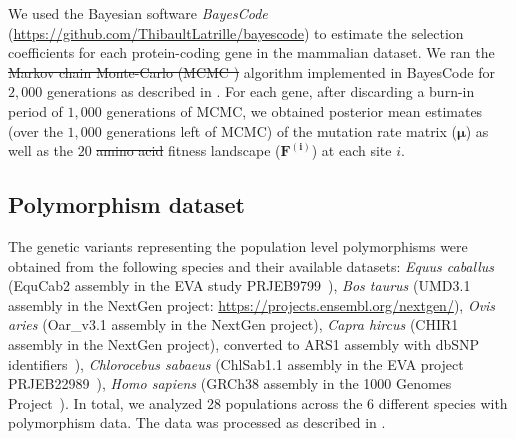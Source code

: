 \documentclass{article}
\newcommand{\UniDimArray}[1]{\bm{#1}}
\providecommand{\DIFaddtex}[1]{{\protect\color{blue}\uwave{#1}}} %
\providecommand{\DIFdeltex}[1]{{\protect\color{red}\sout{#1}}}                      %
\providecommand{\DIFaddbegin}{} %
\providecommand{\DIFaddend}{} %
\providecommand{\DIFdelbegin}{} %
\providecommand{\DIFdelend}{} %
\providecommand{\DIFadd}[1]{\texorpdfstring{\DIFaddtex{#1}}{#1}} %
\providecommand{\DIFdel}[1]{\texorpdfstring{\DIFdeltex{#1}}{}} %
\newcommand{\DIFscaledelfig}{0.5}
\newlength{\DIFdelgraphicswidth} %
\newlength{\DIFdelgraphicsheight} %
\newcommand{\DIFaddincludegraphics}[2][]{{\color{blue}\fbox{\DIFOincludegraphics[#1]{#2}}}} %
\newcommand{\DIFdelincludegraphics}[2][]{%
\sbox{\DIFdelgraphicsbox}{\DIFOincludegraphics[#1]{#2}}%
\settoboxwidth{\DIFdelgraphicswidth}{\DIFdelgraphicsbox} %
\settoboxtotalheight{\DIFdelgraphicsheight}{\DIFdelgraphicsbox} %
\scalebox{\DIFscaledelfig}{%
\parbox[b]{\DIFdelgraphicswidth}{\usebox{\DIFdelgraphicsbox}\\[-\baselineskip] \rule{\DIFdelgraphicswidth}{0em}}\llap{\resizebox{\DIFdelgraphicswidth}{\DIFdelgraphicsheight}{%
\setlength{\unitlength}{\DIFdelgraphicswidth}%
\begin{picture}(1,1)%
\thicklines\linethickness{2pt} %
{\color[rgb]{1,0,0}\put(0,0){\framebox(1,1){}}}%
{\color[rgb]{1,0,0}\put(0,0){\line( 1,1){1}}}%
{\color[rgb]{1,0,0}\put(0,1){\line(1,-1){1}}}%
\end{picture}%
}\hspace*{3pt}}} %
} %
\DeclareRobustCommand{\DIFaddbegin}{\DIFOaddbegin \let\includegraphics\DIFaddincludegraphics} %
\DeclareRobustCommand{\DIFaddend}{\DIFOaddend \let\includegraphics\DIFOincludegraphics} %
\DeclareRobustCommand{\DIFdelbegin}{\DIFOdelbegin \let\includegraphics\DIFdelincludegraphics} %
\DeclareRobustCommand{\DIFdelend}{\DIFOaddend \let\includegraphics\DIFOincludegraphics} %
\begin{document}
    \DIFaddend We used the Bayesian software \textit{BayesCode} (\url{https://github.com/ThibaultLatrille/bayescode}\DIFaddbegin \DIFadd{, v1.3.1}\DIFaddend ) to estimate the selection coefficients for each protein-coding gene in the mammalian dataset.
    We ran the \DIFdelbegin \DIFdel{Markov chain Monte-Carlo (MCMC ) }\DIFdelend \DIFaddbegin \DIFadd{MCMC }\DIFaddend algorithm implemented in BayesCode for $2,000$ generations as described in \textcite{latrille_genes_2023}.
    For each gene, after discarding a burn-in period of $1,000$ generations of MCMC, we obtained posterior mean estimates (over the $1,000$ generations left of MCMC) of the mutation rate matrix ($\UniDimArray{\mu}$) as well as the $20$ \DIFdelbegin \DIFdel{amino acid }\DIFdelend \DIFaddbegin \DIFadd{amino-acid }\DIFaddend fitness landscape ($\UniDimArray{F^{(i)}}$) at each site $i$.

    \subsection{Polymorphism dataset}
    \label{subsec:polymorphism-dataset}

    The genetic variants representing the population level polymorphisms were obtained from the following species and their available datasets: \textit{Equus caballus} (EquCab2 assembly in the EVA study PRJEB9799~\cite{alabri_whole_2020}), \textit{Bos taurus} (UMD3.1 assembly in the NextGen project: \url{https://projects.ensembl.org/nextgen/}), \textit{Ovis aries} (Oar\_v3.1 assembly in the NextGen project), \textit{Capra hircus} (CHIR1 assembly in the NextGen project), converted to ARS1 assembly with dbSNP identifiers~\cite{sherry_dbsnp_2001}), \textit{Chlorocebus sabaeus} (ChlSab1.1 assembly in the EVA project PRJEB22989~\cite{svardal_ancient_2017}), \textit{Homo sapiens} (GRCh38 assembly in the 1000 Genomes Project~\cite{zheng-bradley_alignment_2017}).
    In total, we analyzed 28 populations across the 6 different species with polymorphism data.
    The data was processed as described in \textcite{latrille_genes_2023}.
\end{document}
